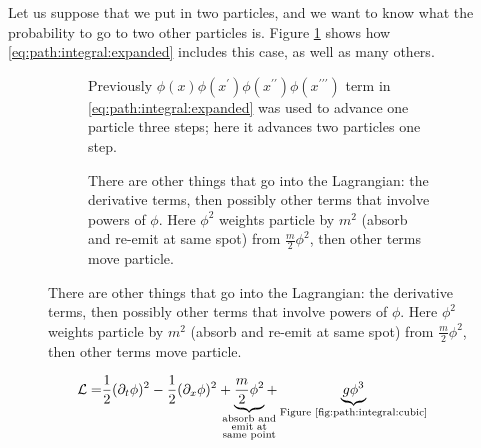 \documentclass[]{article}
\begin{document}
Let us suppose that we put in two particles, and we want to know what the probability to go to two other particles is. Figure \ref{fig:2particles} shows how \eqref{eq:path:integral:expanded} includes this case, as well as many others.
\begin{figure}[H]
	\caption{Calculating the probability for two particles}\label{fig:path:integral:2particles:1}
	\begin{subfigure}[t]{0.45\textwidth}
		\caption{Previously $\phi(x) \phi(x^\prime) \phi(x^{\prime\prime}) \phi(x^{\prime\prime\prime})$ term in \eqref{eq:path:integral:expanded} was used to advance one particle three steps; here it advances two particles one step.}\label{fig:2particles}
	\end{subfigure}
	\hfill
	\begin{subfigure}[t]{0.45\textwidth}
		\caption{There are other things that go into the Lagrangian: the derivative terms, then possibly other terms that involve powers of $\phi$. Here $\phi^2$ weights particle by $m^2$ (absorb and re-emit at same spot) from $\frac{m}{2}\phi^2$, then other terms move particle.}\label{fig:path:integral:mass}
	\end{subfigure}
\end{figure}
 


\begin{align*}
	\mathcal{L}=& \frac{1}{2} (\partial_t \phi)^2 - \frac{1}{2} (\partial_x \phi)^2 + \underbrace{\frac{m}{2}\phi^2}_{\mathclap{\substack{\text{absorb and}\\
				\text{emit at}\\
				\text{same point}}}} +\underbrace{g \phi^3}_\text{Figure \ref{fig:path:integral:cubic}}
\end{align*}
\end{document}
